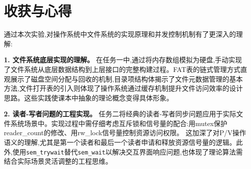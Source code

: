 \section{收获与心得}
通过本次实验,对操作系统中文件系统的实现原理和并发控制机制有了更深入的理解:

\textbf{1. 文件系统底层实现的理解。} 在任务一中,通过将内存数组模拟为硬盘,手动实现了文件系统从底层数据结构到上层接口的完整构建过程。FAT表的链式管理方式直观展示了磁盘空间分配与回收的机制,目录项结构体揭示了文件元数据管理的基本方法,文件打开表的引入则体现了操作系统通过缓存机制提升文件访问效率的设计思路。这些实践使课本中抽象的理论概念变得具体形象。

\textbf{2. 读者-写者问题的工程实现。} 任务二将经典的读者-写者同步问题应用于实际文件系统场景中。实现过程中需仔细考虑互斥锁和信号量的配合:用mutex保护reader\_count的修改、用rw\_lock信号量控制资源访问权限。
这加深了对P/V操作语义的理解,尤其是第一个读者和最后一个读者申请和释放资源信号量的逻辑。此外,使用\texttt{sem\_trywait}替代\texttt{sem\_wait}以解决交互界面响应问题,也体现了理论算法需结合实际场景灵活调整的工程思维。
